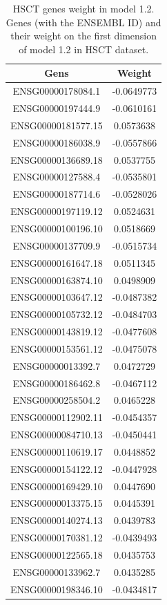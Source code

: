 \documentclass[
  12pt,
  a4paper,
  twoside,
  openright]{book}
\begin{document}
\begin{longtable}[t]{cc}
\caption[HSCT genes weight in model 1.2]{\label{tab:hsct-genes-1-2}HSCT genes weight in model 1.2. Genes (with the ENSEMBL ID) and their weight on the first dimension of model 1.2 in HSCT dataset.}\\
\toprule
Gens & Weight\\
\midrule
ENSG00000178084.1 & -0.0649773\\
ENSG00000197444.9 & -0.0610161\\
ENSG00000181577.15 & 0.0573638\\
ENSG00000186038.9 & -0.0557866\\
ENSG00000136689.18 & 0.0537755\\
\addlinespace
ENSG00000127588.4 & -0.0535801\\
ENSG00000187714.6 & -0.0528026\\
ENSG00000197119.12 & 0.0524631\\
ENSG00000100196.10 & 0.0518669\\
ENSG00000137709.9 & -0.0515734\\
\addlinespace
ENSG00000161647.18 & 0.0511345\\
ENSG00000163874.10 & 0.0498909\\
ENSG00000103647.12 & -0.0487382\\
ENSG00000105732.12 & -0.0484703\\
ENSG00000143819.12 & -0.0477608\\
\addlinespace
ENSG00000153561.12 & -0.0475078\\
ENSG00000013392.7 & 0.0472729\\
ENSG00000186462.8 & -0.0467112\\
ENSG00000258504.2 & 0.0465228\\
ENSG00000112902.11 & -0.0454357\\
\addlinespace
ENSG00000084710.13 & -0.0450441\\
ENSG00000110619.17 & 0.0448852\\
ENSG00000154122.12 & -0.0447928\\
ENSG00000169429.10 & 0.0447690\\
ENSG00000013375.15 & 0.0445391\\
\addlinespace
ENSG00000140274.13 & 0.0439783\\
ENSG00000170381.12 & -0.0439493\\
ENSG00000122565.18 & 0.0435753\\
ENSG00000133962.7 & 0.0435285\\
ENSG00000198346.10 & -0.0434817\\
\bottomrule
\end{longtable}
\end{document}

